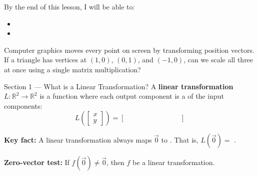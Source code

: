 \documentclass[10pt]{article}
\begin{document}
\namedateperiod

\vspace{0.1in}

\begin{objectivebox}
By the end of this lesson, I will be able to:
\begin{itemize}[leftmargin=1.5em, itemsep=3pt]
  \item \writeline
  \item \writeline
\end{itemize}
\end{objectivebox}

\vspace{0.08in}

\begin{vocabbox}
\end{vocabbox}

\vspace{0.08in}

\begin{hookbox}
Computer graphics moves every point on screen by transforming position vectors.
If a triangle has vertices at $(1,0)$, $(0,1)$, and $(-1,0)$, can we scale all three
at once using a single matrix multiplication?

\writeline
\end{hookbox}

\vspace{0.08in}

\begin{notesbox}{Section 1 --- What is a Linear Transformation?}
\small
A \textbf{linear transformation} $L:\mathbb{R}^2\to\mathbb{R}^2$ is a function where each
output component is a \blank{4.5cm} of the input components:
\[
  L\!\left(\begin{bmatrix}x\\y\end{bmatrix}\right)
  = \begin{bmatrix}\hspace{3cm}\\\hspace{3cm}\end{bmatrix}
\]

\textbf{Key fact:} A linear transformation always maps $\vec{0}$ to \blank{2.5cm}.
That is, $L(\vec{0}) = $ \blank{1.5cm}.

\vspace{0.08in}
\textbf{Zero-vector test:} If $f(\vec{0}) \ne \vec{0}$, then $f$ \blank{2.5cm}
be a linear transformation.
\end{notesbox}
\end{document}
